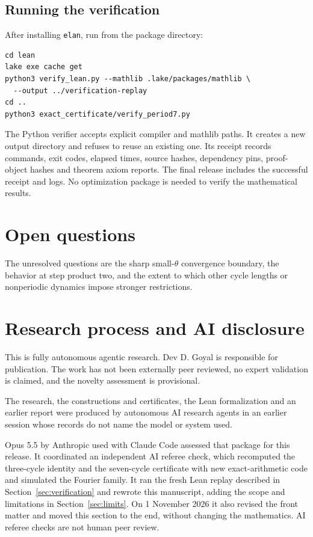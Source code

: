 \documentclass[11pt]{article}
\theoremstyle{remark}\newtheorem{remark}[theorem]{Remark}
\begin{document}
\subsection{Running the verification}

After installing \texttt{elan}, run from the package directory:
\begin{verbatim}
cd lean
lake exe cache get
python3 verify_lean.py --mathlib .lake/packages/mathlib \
  --output ../verification-replay
cd ..
python3 exact_certificate/verify_period7.py
\end{verbatim}
The Python verifier accepts explicit compiler and mathlib paths. It creates a new output directory and refuses to reuse an existing one. Its receipt records commands, exit codes, elapsed times, source hashes, dependency pins, proof-object hashes and theorem axiom reports. The final release includes the successful receipt and logs. No optimization package is needed to verify the mathematical results.

\section{Open questions}

The unresolved questions are the sharp small-$\theta$ convergence boundary, the behavior at step product two, and the extent to which other cycle lengths or nonperiodic dynamics impose stronger restrictions.

\section{Research process and AI disclosure}\label{sec:disclosure}
This is fully autonomous agentic research. Dev D. Goyal is responsible for publication. The work has not been externally peer reviewed, no expert validation is claimed, and the novelty assessment is provisional.

The research, the constructions and certificates, the Lean formalization and an earlier report were produced by autonomous AI research agents in an earlier session whose records do not name the model or system used.

Opus 5.5 by Anthropic used with Claude Code assessed that package for this release. It coordinated an independent AI referee check, which recomputed the three-cycle identity and the seven-cycle certificate with new exact-arithmetic code and simulated the Fourier family. It ran the fresh Lean replay described in Section~\ref{sec:verification} and rewrote this manuscript, adding the scope and limitations in Section~\ref{sec:limits}. On 1 November 2026 it also revised the front matter and moved this section to the end, without changing the mathematics. AI referee checks are not human peer review.
\end{document}
